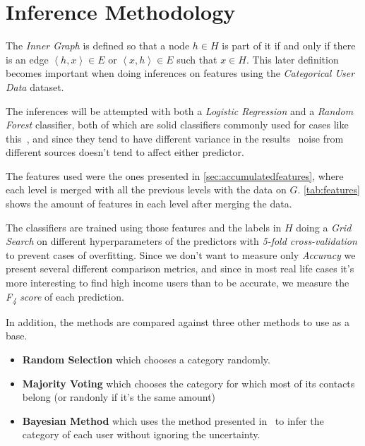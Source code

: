\section{Inference Methodology}
\label{sec:inference_methodology}

The \emph{Inner Graph} is defined so that a node $h \in H$ is part of it if and only if there is an edge $\left< h, x \right> \in E$ or $\left< x, h \right> \in E$ such that $x \in H$\footnotemark{}. This later definition becomes important when doing inferences on features using the \emph{Categorical User Data} dataset.


The inferences will be attempted with both a \emph{Logistic Regression} and a \emph{Random Forest} classifier, both of which are solid classifiers commonly used for cases like this~\cite{binaryevaluation}, and since they tend to have different variance in the results~\cite{ting2016} noise from different sources doesn't tend to affect either predictor.

The features used were the ones presented in \cref{sec:accumulatedfeatures}, where each level is merged with all the previous levels with the data on $G$. \cref{tab:features} shows the amount of features in each level after merging the data.

The classifiers are trained using those features and the labels in $H$ doing a \emph{Grid Search} on different hyperparameters of the predictors with \emph{5-fold cross-validation} to prevent cases of overfitting. Since we don't want to measure only \emph{Accuracy} we present several different comparison metrics, and since in most real life cases it's more interesting to find high income users than to be accurate\footnotemark{}, we measure the \emph{F\textsubscript{4} score} of each prediction.


In addition, the methods are compared against three other methods to use as a base.

\begin{itemize}
	\item \textbf{Random Selection} which chooses a category randomly.
	\item \textbf{Majority Voting} which chooses the category for which most of its contacts belong (or randonly if it's the same amount)
	\item \textbf{Bayesian Method} which uses the method presented in~\cite{fixmanasonam2016} to infer the category of each user without ignoring the uncertainty.
\end{itemize}
